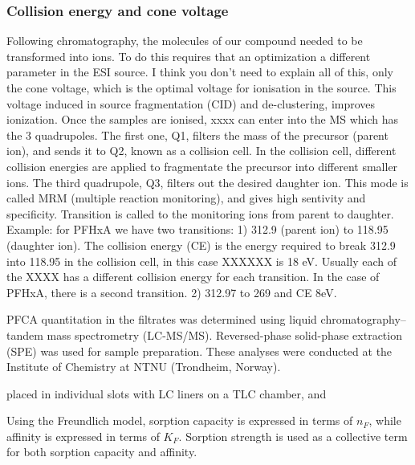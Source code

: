 \subsubsection{Collision energy and cone voltage}
Following chromatography, the molecules of our compound needed to be transformed into ions. To do this requires that an optimization a different parameter in the ESI source. I think you don’t need to explain all of this, only the cone voltage, which is the optimal voltage for ionisation in the source. This voltage induced in source fragmentation (CID) and de-clustering, improves ionization. Once the samples are ionised, xxxx can enter into the MS which has the 3 quadrupoles. The first one, Q1, filters the mass of the precursor (parent ion), and sends it to Q2, known as a collision cell. In the collision cell, different collision energies are applied to fragmentate the precursor into different smaller ions. The third quadrupole, Q3, filters out the desired daughter ion. This mode is called MRM (multiple reaction monitoring), and gives high sentivity and specificity.
Transition is called to the monitoring ions from parent to daughter. 
Example: for PFHxA we have two transitions:
1)  312.9 (parent ion) to 118.95 (daughter ion). The collision energy (\acrshort{CE}) is the energy required to break 312.9 into 118.95 in the collision cell, in this case XXXXXX is 18 eV. Usually each of the XXXX has  a different collision energy for each transition. In the case of PFHxA, there is a second transition.
2)  312.97 to 269 and CE 8eV.

PFCA quantitation in the filtrates was determined using  liquid chromatography--tandem mass spectrometry (LC-MS/MS). Reversed-phase solid-phase extraction (SPE) was used for sample preparation. These analyses were conducted at the Institute of Chemistry at NTNU (Trondheim, Norway).

placed in individual slots with LC liners on a \acrshort{TLC} chamber, and

Using the Freundlich model, sorption capacity is expressed in terms of \(n_F\), while affinity is expressed in terms of \(K_F\). Sorption strength is used as a collective term for both sorption capacity and affinity.   